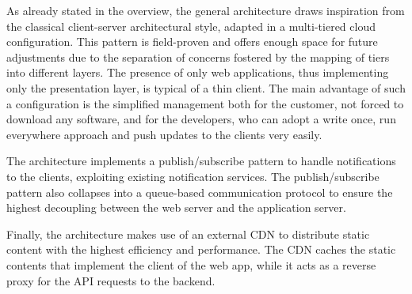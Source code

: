 \documentclass[../../main.tex]{subfiles}
\begin{document}
As already stated in the overview, the general architecture draws inspiration from the classical client-server architectural style, adapted in a multi-tiered cloud configuration.  
This pattern is field-proven and offers enough space for future adjustments due to the separation of concerns fostered by the mapping of tiers into different layers.
The presence of only web applications, thus implementing only the presentation layer, is typical of a thin client. The main advantage of such a configuration is the simplified management both for the customer, not forced to download any software, and for the developers, who can adopt a write once, run everywhere approach and push updates to the clients very easily.

The architecture implements a publish/subscribe pattern to handle notifications to the clients, exploiting existing notification services. 
The publish/subscribe pattern also collapses into a queue-based communication protocol to ensure the highest decoupling between the web server and the application server.

Finally, the architecture makes use of an external CDN to distribute static content with the highest efficiency and performance. The CDN caches the static contents that implement the client of the web app, while it acts as a reverse proxy for the API requests to the backend.
\end{document}
